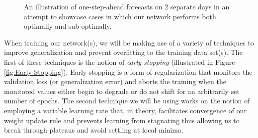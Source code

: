 \begin{figure}[H]
    \begin{adjustwidth}{-3.0cm}{-3.0cm}%
            \myfloatalign
             \quad
             \quad
            \caption{An illustration of one-step-ahead forecasts on 2 separate days in an attempt to showcase cases in which our network performs both optimally and sub-optimally.}
    \end{adjustwidth}
\end{figure}

\noindent \newline When training our network(s), we will be making use of a variety of techniques to improve generalization and prevent overfitting to the training data set(s). The first of these techniques is the notion of \textit{early stopping} (illustrated in Figure \ref{fig:Early-Stopping}). Early stopping is a form of regularization that monitors the validation loss (or generalization error) and aborts the training when the monitored values either begin to degrade or do not shift for an arbitrarily set number of epochs. The second technique we will be using works on the notion of employing a variable learning rate that, in theory, facilitates convergence of our weight update rule and prevents learning from stagnating thus allowing us to break through plateaus and avoid settling at local minima.

